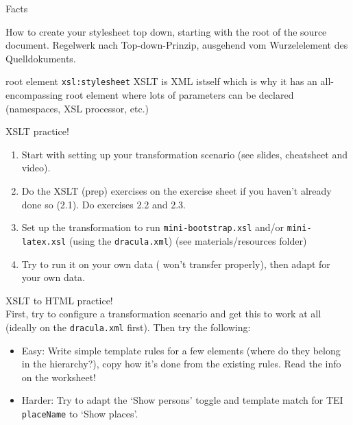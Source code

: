 \begin{frame}[fragile]{Facts}

\begin{block}{How to create your stylesheet}
top down, starting with the root of the source document.
Regelwerk nach Top-down-Prinzip, ausgehend vom
Wurzelelement des Quelldokuments.

\end{block} 

\begin{block}{root element \texttt{xsl:stylesheet}}
XSLT is XML istself which is why it has an all-encompassing root element where lots of parameters can be declared (namespaces, XSL processor, etc.) 
\end{block}

\end{frame}




\begin{frame}[standout]
    \alert{XSLT practice!} \\
    \begin{enumerate}\small
        \item Start with setting up your transformation scenario (see slides, cheatsheet and video).
        \item Do the XSLT (prep) exercises on the exercise sheet if you haven't already done so (2.1). Do exercises 2.2 and 2.3.
        \item Set up the transformation to run \texttt{mini-bootstrap.xsl} and/or \texttt{mini-latex.xsl} (using the \texttt{dracula.xml}) (see materials/resources folder)
        \item Try to run it on your own data ( won't transfer properly), then adapt for your own data.
    \end{enumerate} 
\end{frame}


\begin{frame}[standout]
    \alert{XSLT to HTML practice!} \\
    \small
    First, try to configure a transformation scenario and get this to work at all (ideally on the \texttt{dracula.xml} first). Then try the following:
    \begin{itemize}\small
        \item \alert{Easy:} Write simple template rules for a few elements (where do they belong in the hierarchy?), copy how it's done from the existing rules. Read the info on the worksheet!
        \item \alert{Harder:} Try to adapt the `Show persons' toggle and template match for TEI \texttt{placeName} to `Show places'.
    \end{itemize} 
\end{frame}

